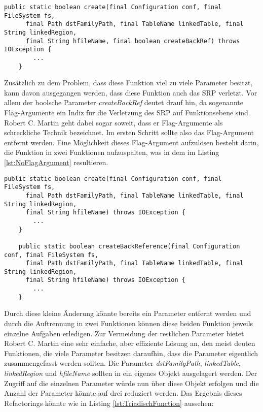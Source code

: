 \begin{lstlisting}[language={[Sharp]C}, caption=Beispiele für Rückgabe eines Null Wertes, label=lst:PolyadischFunction]
  public static boolean create(final Configuration conf, final FileSystem fs,
      final Path dstFamilyPath, final TableName linkedTable, final String linkedRegion,
      final String hfileName, final boolean createBackRef) throws IOException {
		...
	}
\end{lstlisting}

\SuperPar Zusätzlich zu dem Problem, dass diese Funktion viel zu viele Parameter besitzt, kann davon ausgegangen werden, dass diese Funktion auch das SRP verletzt. Vor allem der boolsche Parameter \textit{createBackRef} deutet drauf hin, da sogenannte Flag-Argumente ein Indiz für die Verletzung des SRP auf Funktionsebene sind. Robert C. Martin geht dabei sogar soweit, dass er Flag-Argumente als schreckliche Technik bezeichnet. Im ersten Schritt sollte also das Flag-Argument entfernt werden. Eine Möglichkeit dieses Flag-Argument aufzulösen besteht darin, die Funktion in zwei Funktionen aufzuspalten, was in dem im Listing  \ref{lst:NoFlagArgument} resultieren.

\begin{lstlisting}[language={[Sharp]C}, caption=Beispiele für Eliminierung des Flag Arguments, label=lst:NoFlagArgument]
   public static boolean create(final Configuration conf, final FileSystem fs,
      final Path dstFamilyPath, final TableName linkedTable, final String linkedRegion,
      final String hfileName) throws IOException {
		...
	}
	
	public static boolean createBackReference(final Configuration conf, final FileSystem fs,
      final Path dstFamilyPath, final TableName linkedTable, final String linkedRegion,
      final String hfileName) throws IOException {
		...
	}
\end{lstlisting}

\SuperPar Durch diese kleine Änderung könnte bereits ein Parameter entfernt werden und durch die Auftrennung in zwei Funktionen können diese beiden Funktion jeweils einzelne Aufgaben erledigen. Zur Vermeidung der restlichen Parameter bietet Robert C. Martin eine sehr einfache, aber effiziente Lösung an, den meist deuten Funktionen, die viele Parameter besitzen daraufhin, dass die Parameter eigentlich zusammengefasst werden sollten. Die Parameter \textit{dstFamilyPath}, \textit{linkedTable}, \textit{linkedRegion} und \textit{hfileName} sollten in ein eigenes Objekt ausgelagert werden. Der Zugriff auf die einzelnen Parameter würde nun über diese Objekt erfolgen und die Anzahl der Parameter könnte auf drei reduziert werden. Das Ergebnis dieses Refactorings könnte wie in Listing \ref{lst:TriadischFunction} aussehen:

